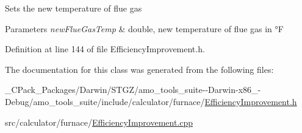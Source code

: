 Sets the new temperature of flue gas


\begin{DoxyParams}{Parameters}
{\em new\+Flue\+Gas\+Temp} & double, new temperature of flue gas in °F \\
\hline
\end{DoxyParams}


Definition at line 144 of file Efficiency\+Improvement.\+h.



The documentation for this class was generated from the following files\+:\begin{DoxyCompactItemize}
\item 
\+\_\+\+C\+Pack\+\_\+\+Packages/\+Darwin/\+S\+T\+G\+Z/amo\+\_\+tools\+\_\+suite-\/-\/\+Darwin-\/x86\+\_-\/\+Debug/amo\+\_\+tools\+\_\+suite/include/calculator/furnace/\hyperlink{___c_pack___packages_2_darwin_2_s_t_g_z_2amo__tools__suite--_darwin-x86__64-_debug_2amo__tools__746a37b72f5159a376bd4f5e36a4146f}{Efficiency\+Improvement.\+h}\item 
src/calculator/furnace/\hyperlink{_efficiency_improvement_8cpp}{Efficiency\+Improvement.\+cpp}\end{DoxyCompactItemize}

